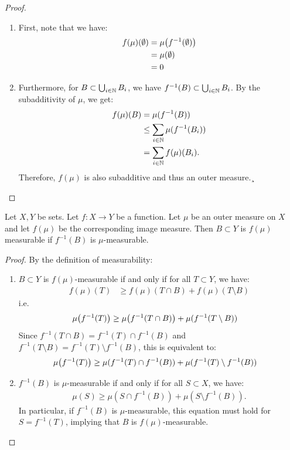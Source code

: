 \begin{proof}
	\begin{enumerate}
		\item First, note that we have:
		\begin{align*}
			f(\mu)(\emptyset) 
			&= \mu\qty(f^{-1}(\emptyset))\\
			&= \mu(\emptyset)\\
			&= 0
		\end{align*}
		\item Furthermore, for $B \subset \bigcup_{i \in \mathbb{N}} B_i$, we have $f^{-1}(B) \subset \bigcup_{i \in \mathbb{N}} B_i$. By the subadditivity of $\mu$, we get:
		\begin{align*}
			f(\mu)(B) &= \mu(f^{-1}(B))\\
			&\leq \sum_{i \in \mathbb{N}} \mu(f^{-1}(B_i))\\
			&= \sum_{i \in \mathbb{N}} f(\mu)(B_i).
		\end{align*}
		Therefore, $f(\mu)$ is also subadditive and thus an outer measure.¸
	\end{enumerate}
\end{proof}
\begin{lemma}
	Let $X,Y$ be sets. Let $f : X \to Y$ be a function. Let $\mu$ be an outer measure on $X$ and let $f(\mu)$ be the corresponding image measure.
	Then $B \subset Y$ is $f(\mu)$ measurable if $f^{-1}(B)$ is $\mu$-measurable.
\end{lemma}
\begin{proof}
	By the definition of measurability:
	\begin{enumerate}
		
		\item $B \subset Y$ is $f(\mu)$-measurable if and only if for all $T \subset Y$, we have:
		\begin{align*}
			f(\mu)(T) 
			&\geq 
			f(\mu)(T \cap B) + f(\mu)(T \setminus B)
		\end{align*}
		i.e.
		\begin{align*}
			\mu\qty(f^{-1}(T))
			&\geq 
			\mu\qty(f^{-1}(T \cap B)) + \mu(f^{-1}(T \setminus B))	
		\end{align*}
		Since $f^{-1}(T \cap B) = f^{-1}(T) \cap f^{-1}(B)$ and $f^{-1}(T \setminus B) = f^{-1}(T) \setminus f^{-1}(B)$, this is equivalent to:
		\begin{align*}
			\mu\qty(f^{-1}(T))
			&\geq 
			\mu(f^{-1}(T) \cap f^{-1}(B))
			+
			\mu(f^{-1}(T) \setminus f^{-1}(B))
		\end{align*}
		\item $f^{-1}(B)$ is $\mu$-measurable if and only if for all $S \subset X$, we have:
		\begin{align*}
			\mu(S) \geq \mu(S \cap f^{-1}(B)) + \mu(S \setminus f^{-1}(B)).
		\end{align*} 
		In particular, if $f^{-1}(B)$ is $\mu$-measurable, this equation must hold for $S = f^{-1}(T)$, implying that $B$ is $f(\mu)$-measurable.
	\end{enumerate}
\end{proof}

